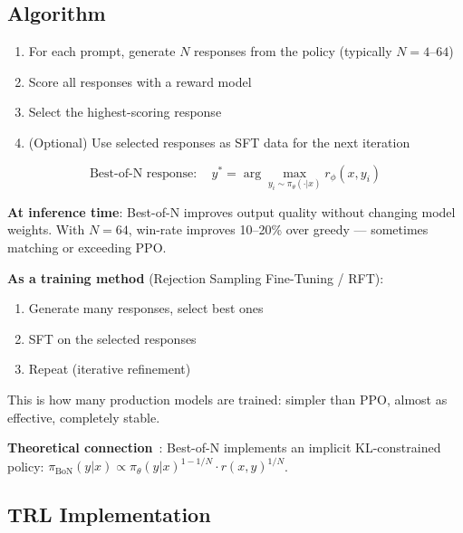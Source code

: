 \subsection{Algorithm}
\label{algorithm-1}

\begin{enumerate}
  \item For each prompt, generate $N$ responses from the policy (typically $N = 4$--$64$)
  \item Score all responses with a reward model
  \item Select the highest-scoring response
  \item (Optional) Use selected responses as SFT data for the next iteration
\end{enumerate}

\begin{equation}
\boxed{\text{Best-of-N response}: \quad y^* = \arg\max_{y_i \sim \pi_\theta(\cdot|x)} r_\phi(x, y_i)}
\end{equation}

\begin{intuitionbox}
\textbf{At inference time}: Best-of-N improves output quality without changing model weights. With $N=64$, win-rate improves 10--20\% over greedy --- sometimes matching or exceeding PPO.

\textbf{As a training method} (Rejection Sampling Fine-Tuning / RFT):

\begin{enumerate}
  \item Generate many responses, select best ones
  \item SFT on the selected responses
  \item Repeat (iterative refinement)
\end{enumerate}

This is how many production models are trained: simpler than PPO, almost as effective, completely stable.

\textbf{Theoretical connection}~\cite{gao2023scaling}: Best-of-N implements an implicit KL-constrained policy: $\pi_\text{BoN}(y|x) \propto \pi_\theta(y|x)^{1-1/N} \cdot r(x,y)^{1/N}$.
\end{intuitionbox}

\subsection{TRL Implementation}
\label{trl-implementation-4}

